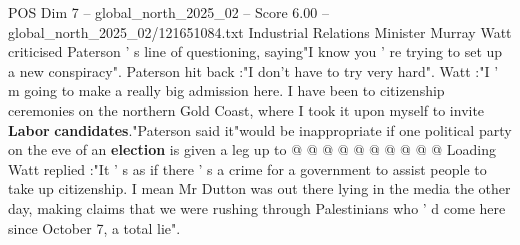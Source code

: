 \begin{textsample}{POS Dim 7 – global\_north\_2025\_02 – Score 6.00 – global\_north\_2025\_02/121651084.txt}
Industrial Relations Minister Murray Watt criticised Paterson ' s line of questioning, saying"I know you ' re trying to set up a new conspiracy".
Paterson hit back :"I don't have to try very hard".
Watt :"I ' m going to make a really big admission here.
I have been to citizenship ceremonies on the northern Gold Coast, where I took it upon myself to invite \textbf{Labor} \textbf{candidates}."Paterson said it"would be inappropriate if one political party on the eve of an \textbf{election} is given a leg up to @ @ @ @ @ @ @ @ @ @ Loading Watt replied :"It ' s as if there ' s a crime for a government to assist people to take up citizenship.
I mean Mr Dutton was out there lying in the media the other day, making claims that we were rushing through Palestinians who ' d come here since October 7, a total lie".

\end{textsample}
